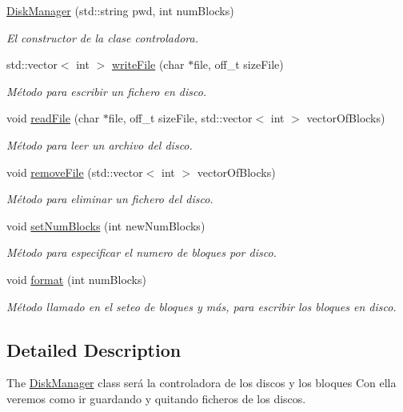 \begin{DoxyCompactItemize}
\item 
\hyperlink{classDiskManager_ae242cbff9557a626ac5a2faa497ad253}{Disk\+Manager} (std\+::string pwd, int num\+Blocks)
\begin{DoxyCompactList}\small\item\em El constructor de la clase controladora. \end{DoxyCompactList}\item 
std\+::vector$<$ int $>$ \hyperlink{classDiskManager_a864cc38c2a8b2beb355bec5bf55b8658}{write\+File} (char $\ast$file, off\+\_\+t size\+File)
\begin{DoxyCompactList}\small\item\em Método para escribir un fichero en disco. \end{DoxyCompactList}\item 
void \hyperlink{classDiskManager_adc44a3ae9133252903bbb95d974238bc}{read\+File} (char $\ast$file, off\+\_\+t size\+File, std\+::vector$<$ int $>$ vector\+Of\+Blocks)
\begin{DoxyCompactList}\small\item\em Método para leer un archivo del disco. \end{DoxyCompactList}\item 
void \hyperlink{classDiskManager_a8992533f7c0308c716c26672e5f315a2}{remove\+File} (std\+::vector$<$ int $>$ vector\+Of\+Blocks)
\begin{DoxyCompactList}\small\item\em Método para eliminar un fichero del disco. \end{DoxyCompactList}\item 
void \hyperlink{classDiskManager_a49f4db7b478571d82860bcfe1d63fa6a}{set\+Num\+Blocks} (int new\+Num\+Blocks)
\begin{DoxyCompactList}\small\item\em Método para especificar el numero de bloques por disco. \end{DoxyCompactList}\item 
void \hyperlink{classDiskManager_a77f220a41db4ce7d3ec5d2a6b2682307}{format} (int num\+Blocks)
\begin{DoxyCompactList}\small\item\em Método llamado en el seteo de bloques y más, para escribir los bloques en disco. \end{DoxyCompactList}\end{DoxyCompactItemize}


\subsection{Detailed Description}
The \hyperlink{classDiskManager}{Disk\+Manager} class será la controladora de los discos y los bloques Con ella veremos como ir guardando y quitando ficheros de los discos. 

